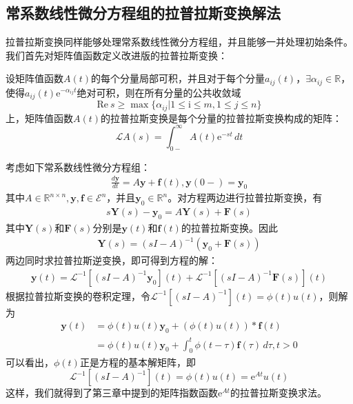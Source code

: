 \subsection{常系数线性微分方程组的拉普拉斯变换解法}\label{sub:laplace_ode_system}

拉普拉斯变换同样能够处理常系数线性微分方程组，并且能够一并处理初始条件。我们首先对矩阵值函数定义改进版的拉普拉斯变换：
\begin{definition}[矩阵值函数的拉普拉斯变换]
    设矩阵值函数$A(t)$的每个分量局部可积，并且对于每个分量$a_{ij}(t)$，$\exists \alpha_{ij}\in\mathbb{R}$，使得$a_{ij}(t)\mathrm{e}^{-\alpha_{ij} t}$绝对可积，则在所有分量的公共收敛域
    $$\text{Re}\ s\geq \max\{\alpha_{ij}|1\leq \mathrm{i}\leq m,1\leq j\leq n\}$$上，矩阵值函数$A(t)$的拉普拉斯变换是每个分量的拉普拉斯变换构成的矩阵：
    \[\mathcal{L} A(s)=\int_{0-}^{\infty}A(t)\mathrm{e}^{-st}\,dt\]
\end{definition}

考虑如下常系数线性微分方程组：
\begin{align*}
    \frac{d\mathbf{y}}{dt}=A\mathbf{y}+\mathbf{f}(t),\mathbf{y}(0-)=\mathbf{y}_0
\end{align*}
其中$A\in\mathbb{R} ^{n\times n},\mathbf{y},\mathbf{f}\in\mathcal{E} ^n$，并且$\mathbf{y}_0\in\mathbb{R} ^n$。对方程两边进行拉普拉斯变换，有
\begin{align*}
    s\mathbf{Y}(s)-\mathbf{y}_0=A\mathbf{Y}(s)+\mathbf{F}(s)
\end{align*}
其中$\mathbf{Y}(s)$和$\mathbf{F}(s)$分别是$\mathbf{y}(t)$和$\mathbf{f}(t)$的拉普拉斯变换。因此
\begin{align*}
    \mathbf{Y}(s)=(sI-A)^{-1}(\mathbf{y}_0+\mathbf{F}(s))
\end{align*}
两边同时求拉普拉斯逆变换，即可得到方程的解：\begin{align*}
    \mathbf{y}(t)=\mathcal{L} ^{-1} \left[(sI-A)^{-1}\mathbf{y}_0\right](t)+\mathcal{L} ^{-1} \left[(sI-A)^{-1}\mathbf{F}(s)\right](t)
\end{align*}
根据拉普拉斯变换的卷积定理，令$\mathcal{L} ^{-1} \left[(sI-A)^{-1}\right](t)=\phi(t)u(t)$，则解为\begin{align*}
    \mathbf{y}(t)&=\phi(t)u(t)\mathbf{y}_0+(\phi(t)u(t))*\mathbf{f}(t)\\
    &=\phi(t)u(t)\mathbf{y}_0+\int_0^{t}\phi(t-\tau)\mathbf{f}(\tau)\,d\tau,t>0
\end{align*}
可以看出，$\phi(t)$正是方程的基本解矩阵，即
$$\mathcal{L}^{-1} \left[(sI-A)^{-1}\right](t)=\phi(t)u(t)=\mathrm{e}^{At}u(t)$$
这样，我们就得到了第三章中提到的矩阵指数函数$\mathrm{e}^{At}$的拉普拉斯变换求法。


